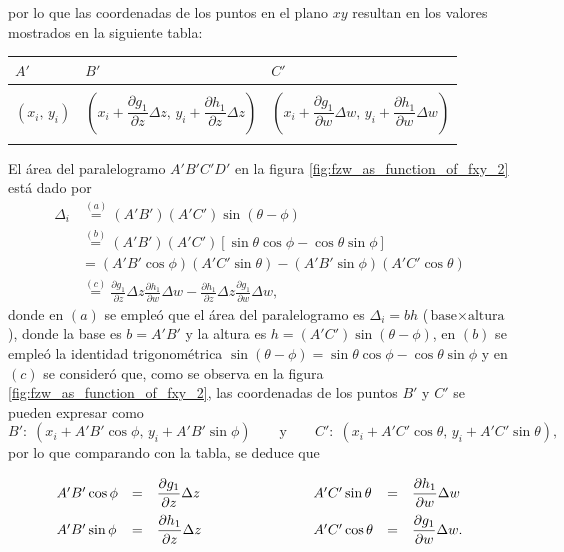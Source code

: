 \documentclass[a4paper]{report}
\begin{document}
por lo que las coordenadas de los puntos en el plano \(xy\) resultan en los valores mostrados en la siguiente tabla:
\begin{center}
\def\arraystretch{1.2}
\begin{tabular}{@{}|>{\centering\arraybackslash}m{4.5cm}|>{\centering\arraybackslash}m{4.5cm}|>{\centering\arraybackslash}m{4.5cm}|@{}}
\hline
\(A'\) & \(B'\)      & \(C'\)   \\ \hline
& & \\[-1em]
\((x_i,\,y_i)\)  & \(\left(x_i+\dfrac{\partial g_1}{\partial z}\Delta z,\,y_i+\dfrac{\partial h_1}{\partial z}\Delta z\right)\) & \(\left(x_i+\dfrac{\partial g_1}{\partial w}\Delta w,\,y_i+\dfrac{\partial h_1}{\partial w}\Delta w\right)\) \\[-1em]
& & \\
\hline
\end{tabular}
\end{center}
El área del paralelogramo \(A'B'C'D'\) en la figura \ref{fig:fzw_as_function_of_fxy_2} está dado por 
\begin{align*}
 \Delta_i&\overset{(a)}{=}(A'B')(A'C')\sin(\theta-\phi)\\
   &\overset{(b)}{=}(A'B')(A'C')\left[\sin\theta\cos\phi-\cos\theta\sin\phi\right]\\
   &=(A'B'\cos\phi)(A'C'\sin\theta)-(A'B'\sin\phi)(A'C'\cos\theta)\\
   &\overset{(c)}{=}\frac{\partial g_1}{\partial z}\Delta z\frac{\partial h_1}{\partial w}\Delta w
     -\frac{\partial h_1}{\partial z}\Delta z\frac{\partial g_1}{\partial w}\Delta w,
\end{align*}
donde en \((a)\) se empleó que el área del paralelogramo es \(\Delta_i=bh\) (\(\textrm{base}\times\textrm{altura}\)), donde la base es \(b=A'B'\) y la altura es \(h=(A'C')\sin(\theta-\phi)\), en \((b)\) se empleó la identidad trigonométrica \(\sin(\theta-\phi)=\sin\theta\cos\phi-\cos\theta\sin\phi\) y en \((c)\) se consideró que, como se observa en la figura \ref{fig:fzw_as_function_of_fxy_2}, las coordenadas de los puntos \(B'\) y \(C'\) se pueden expresar como
\[
 B':\;\left(x_i+A'B'\cos\phi,\,y_i+A'B'\sin\phi\right)
  \qquad\textrm{y}\qquad 
 C':\;\left(x_i+A'C'\cos\theta,\,y_i+A'C'\sin\theta\right), 
\]
por lo que comparando con la tabla, se deduce que
\[
\def\arraystretch{2.2}
 \begin{array}{lllllll}
  A'B'\cos\phi&=&\dfrac{\partial g_1}{\partial z}\Delta z
  &\qquad\qquad\qquad&
  A'C'\sin\theta&=&\dfrac{\partial h_1}{\partial w}\Delta w\\
  A'B'\sin\phi&=&\dfrac{\partial h_1}{\partial z}\Delta z
  &\qquad\qquad\qquad&
  A'C'\cos\theta&=&\dfrac{\partial g_1}{\partial w}\Delta w.
 \end{array}
\]
\end{document}
